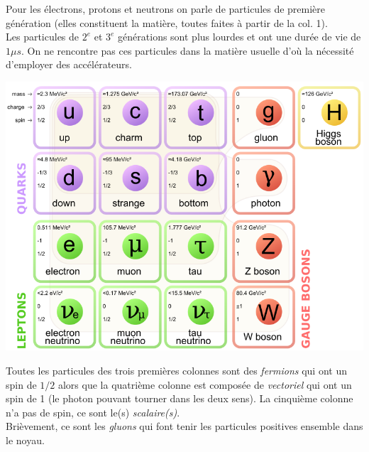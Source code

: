 \documentclass[british,french,11pt, a4paper, openany]{book}
\begin{document}
	Pour les électrons, protons et neutrons on parle de particules de première génération (elles constituent la matière, toutes faites à partir de la col. 1).\\
	Les particules de $2^e$ et $3^e$ générations sont plus lourdes et ont une durée de vie de $1 \mu s$. On ne rencontre pas ces particules dans la matière usuelle d'où la nécessité d'employer des accélérateurs.\\
	\begin{center}
		\includegraphics[scale=0.25]{img/particulelem}
	\end{center}
	Toutes les particules des trois premières colonnes sont des \textit{fermions} qui ont un spin de $1/2$ alors que la quatrième colonne est composée de \textit{vectoriel} qui ont un spin de 1 (le photon pouvant tourner dans les deux sens). La cinquième colonne n'a pas de spin, ce sont le(s) \textit{scalaire(s)}.\\
	Brièvement, ce sont les \textit{gluons} qui font tenir les particules positives ensemble dans le noyau.
	
\end{document}
